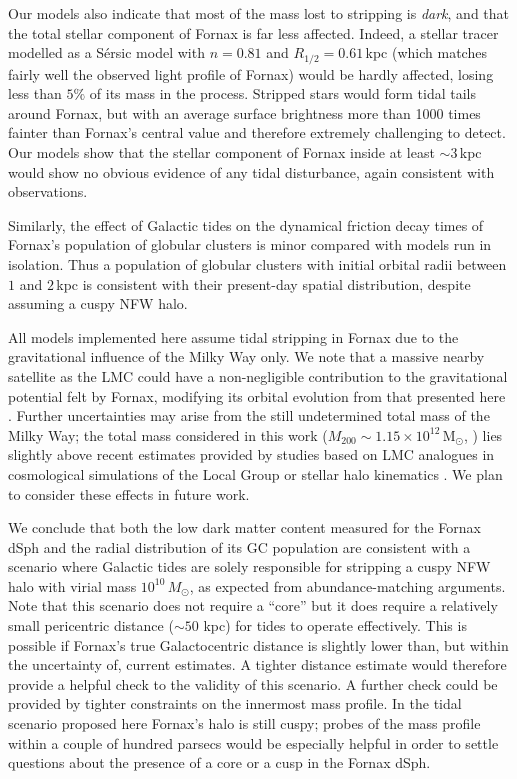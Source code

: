 \documentclass[fleqn,usenatbib]{mnras}
\begin{document}
Our models also indicate that most of the mass lost to stripping is \emph{dark}, and that the total stellar component of Fornax is far less affected. Indeed, a stellar tracer modelled as a S\' ersic  model with $n=0.81$ and $R_{1/2}=0.61$\,kpc (which matches fairly well the observed light profile of Fornax) would be hardly affected, losing less than $5\%$ of its mass in the process. Stripped stars would form tidal tails around Fornax, but with an average surface brightness more than 1000 times fainter than Fornax's central value and therefore extremely challenging to detect. Our models show that the stellar component of Fornax inside at least $\sim 3$\,kpc would show no obvious evidence of any tidal disturbance, again consistent with observations.

Similarly, the effect of Galactic tides on the dynamical friction decay times of Fornax's population of globular clusters is minor compared with models run in isolation. Thus a population of globular clusters with initial orbital radii between $1$ and $2$\,kpc is consistent with their present-day spatial distribution, despite assuming a cuspy NFW halo.

All models implemented here assume tidal stripping in Fornax due to the gravitational influence of the Milky Way only. We note that a massive nearby satellite as the LMC could have a non-negligible contribution to the gravitational potential felt by Fornax, modifying its orbital evolution from that presented here \citep[see e.g.,][]{Erkal2019,Patel2020}. Further uncertainties may arise from the still undetermined total mass of the Milky Way; the total mass considered in this work ($M_{200}\sim 1.15\times 10^{12}$\,M$_\odot$, \citet{McMillan2011}) lies slightly above recent estimates provided by studies based on LMC analogues in cosmological simulations of the Local Group \citep{Santos2021} or stellar halo kinematics \citep{Deason2021}. We plan to consider these effects in future work.

We conclude that both the low dark matter content measured for the Fornax dSph and the radial distribution of its GC population are consistent with a scenario where Galactic tides are solely responsible for stripping a cuspy NFW halo with virial mass $10^{10}\, M_\odot$, as expected from abundance-matching arguments. Note that this scenario does not require a ``core'' but it does require a relatively small pericentric distance ($\sim 50$ kpc) for tides to operate effectively. This is possible if Fornax's true Galactocentric distance is slightly lower than, but within the uncertainty of, current estimates. A tighter distance estimate would therefore provide a helpful check to the validity of this scenario. A further check could be provided by tighter constraints on the innermost mass profile. In the tidal scenario proposed here Fornax's halo is still cuspy; probes of the mass profile within a couple of hundred parsecs would be especially helpful in order to settle questions about the presence of a core or a cusp in the Fornax dSph.
\end{document}
